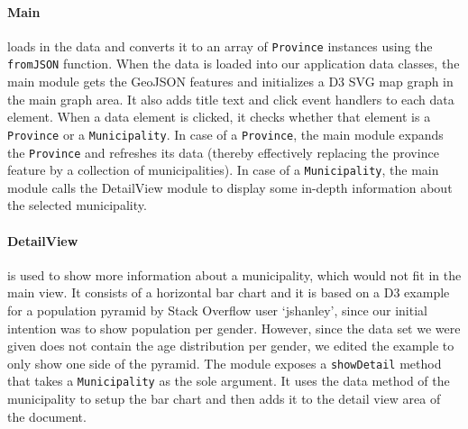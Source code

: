 			\paragraph{Main} loads in the data and converts it to an array of \texttt{Province} instances using the \texttt{fromJSON} function.
				When the data is loaded into our application data classes, the main module gets the GeoJSON features and initializes a D3 SVG map graph in the main graph area.
				It also adds title text and click event handlers to each data element.
				When a data element is clicked, it checks whether that element is a \texttt{Province} or a \texttt{Municipality}.
				In case of a \texttt{Province}, the main module expands the \texttt{Province} and refreshes its data (thereby effectively replacing the province feature by a collection of municipalities).
				In case of a \texttt{Municipality}, the main module calls the DetailView module to display some in-depth information about the selected municipality.

			\paragraph{DetailView} is used to show more information about a municipality, which would not fit in the main view.
				It consists of a horizontal bar chart and it is based on a D3 example for a population pyramid by Stack Overflow user `jshanley', since our initial intention was to show population per gender.
				However, since the data set we were given does not contain the age distribution per gender, we edited the example to only show one side of the pyramid.
				The module exposes a \texttt{showDetail} method that takes a \texttt{Municipality} as the sole argument.
				It uses the data method of the municipality to setup the bar chart and then adds it to the detail view area of the document.

